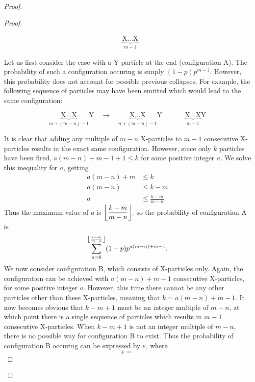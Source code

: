 \begin{proof}
\begin{proof}
\begin{figure}[H]
\begin{align*}
        &\underbrace{\text{X}\dots\text{X}}_{m-1} \tag{B}
      \end{align*}
      \vspace{-2em}
    \end{figure}
    Let us first consider the case with a Y-particle at the end (configuration A). The probability of such a configuration occuring is simply $(1-p)p^{m-1}$. However, this probability does not account for possible previous collapses. For example, the following sequence of particles may have been emitted which would lead to the same configuration:
    \begin{figure}[H]
      \vspace{-1.5em}
      \begin{equation*}
        \underbrace{\text{X}\dots\text{X}}_{m + (m-n) - 1}\text{Y} \quad \longrightarrow \quad \underbrace{\text{X}\dots\text{X}}_{n+(m-n)-1}\text{Y}\quad = \quad \underbrace{\text{X}\dots\text{X}}_{m-1}\text{Y} 
      \end{equation*}
      \vspace{-2em}
    \end{figure}
    It is clear that adding any multiple of $m-n$ X-particles to $m-1$ consecutive X-particles results in the exact same configuration. However, since only $k$ particles have been fired, $a(m-n) + m-1 + 1 \le k$ for some positive integer $a$. We solve this inequality for $a$, getting
    \begin{align*}
      a(m-n) + m &\le k \\
      a(m-n) &\le k - m \\
      a &\le \frac{k-m}{m-n}.
    \end{align*}
    Thus the maximum value of $a$ is $\floor*{\dfrac{k-m}{m-n}},$ so the probability of configuration A is \[
      \sum_{a=0}^{\floor*{\frac{k-m}{m-n}}} (1-p)p^{a(m-n)+m-1}
    .\]
    We now consider configuration B, which consists of X-particles only. Again, the configuration can be achieved with $a(m-n) + m-1$ consecutive X-particles, for some positive integer $a$. However, this time there cannot be any other particles other than these X-particles, meaning that  $k = a(m-n) + m-1$. It now becomes obvious that $k-m+1$ must be an integer multiple of $m-n$, at which point there is a single sequence of particles which results in $m-1$ consecutive X-particles. When $k-m+1$ is not an integer multiple of $m-n$, there is no possible way for configuration B to exist. Thus the probability of configuration B occuring can be expressed by $\varepsilon$, where \[
      \varepsilon = 
\]
\end{proof}
\end{proof}

